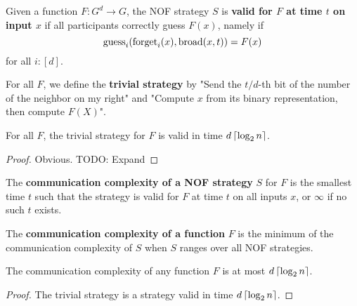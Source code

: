 \begin{definition}
  \label{def:valid-strategy}
  \leanok

  Given a function $F : G^d \to G$, the NOF strategy $S$ is {\bf valid for $F$ at time $t$ on input $x$} if all participants correctly guess $F(x)$, namely if
  $$\operatorname{guess}_i(\operatorname{forget}_i(x), \operatorname{broad}(x, t)) = F(x)$$
  for all $i : [d]$.
\end{definition}

\begin{definition}
  \label{def:trivial-strategy}

  For all $F$, we define the {\bf trivial strategy} by "Send the $t / d$-th bit of the number of the neighbor on my right" and "Compute $x$ from its binary representation, then compute $F(X)$".
\end{definition}

\begin{lemma}
  \label{lem:trivial-strategy-valid}

  For all $F$, the trivial strategy for $F$ is valid in time $d\left\lceil \log_2 n\right\rceil$.
\end{lemma}
\begin{proof}

  Obvious. TODO: Expand
\end{proof}

\begin{definition}
  \label{def:strategy-complexity}

  The {\bf communication complexity of a NOF strategy} $S$ for $F$ is the smallest time $t$ such that the strategy is valid for $F$ at time $t$ on all inputs $x$, or $\infty$ if no such $t$ exists.
\end{definition}

\begin{definition}
  \label{def:function-complexity}

  The {\bf communication complexity of a function} $F$ is the minimum of the communication complexity of $S$ when $S$ ranges over all NOF strategies.
\end{definition}

\begin{lemma}
  \label{lem:trivial-bound-function-complexity}

  The communication complexity of any function $F$ is at most $d\left\lceil \log_2 n\right\rceil$.
\end{lemma}
\begin{proof}

  The trivial strategy is a strategy valid in time $d\left\lceil \log_2 n\right\rceil$.
\end{proof}

